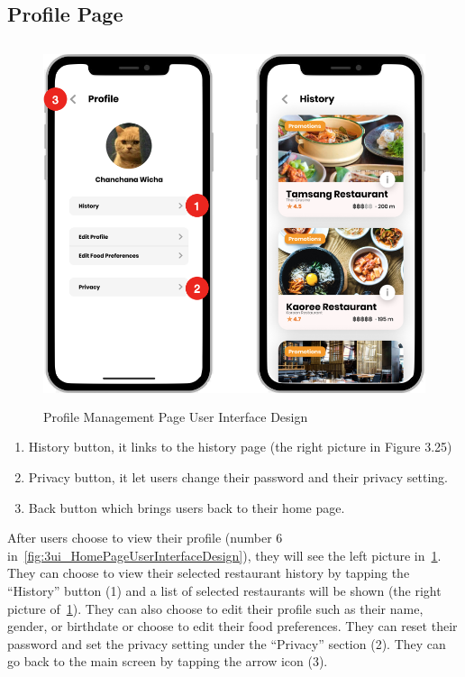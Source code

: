 \documentclass[12pt,oneside,openright,a4paper]{cpe-english-project}
\begin{document}
\subsection{Profile Page}
\begin{figure}[!h]\centering
\includegraphics[height=300pt]{./images/3ui_ProfileManagementPageUserInterfaceDesign.png}
\caption{Profile Management Page User Interface Design}\label{fig:3ui_ProfileManagementPageUserInterfaceDesign}
\end{figure}
\begin{enumerate}
\item History button, it links to the history page (the right picture in Figure 3.25)
\item Privacy button, it let users change their password and their privacy setting.
\item Back button which brings users back to their home page.
\end{enumerate}
After users choose to view their profile (number 6 in~\ref{fig:3ui_HomePageUserInterfaceDesign}), they will see the left picture in~\ref{fig:3ui_ProfileManagementPageUserInterfaceDesign}. They can choose to view their selected restaurant history by tapping the “History” button (1) and a list of selected restaurants will be shown (the right picture of~\ref{fig:3ui_ProfileManagementPageUserInterfaceDesign}). They can also choose to edit their profile such as their name, gender, or birthdate or choose to edit their food preferences. They can reset their password and set the privacy setting under the “Privacy” section (2). They can go back to the main screen by tapping the arrow icon (3).
\end{document}

